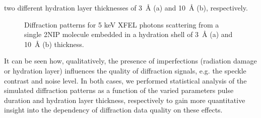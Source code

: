 \documentclass[10pt]{scrartcl}
\begin{document}
two different hydration layer thicknesses of \SI{3}{\angstrom} (a) and
\SI{10}{\angstrom} (b), respectively.
%
\begin{figure}[ht]
  \begin{center}
  \end{center}
  \caption{Diffraction patterns for 5 keV XFEL photons scattering from a single
    2NIP molecule embedded in a hydration shell of \SI{3}{\angstrom} (a) and
    \SI{10}{\angstrom} (b) thickness.}
  \label{fig:2nip_hydration_layer}
\end{figure}

It can be seen how, qualitatively, the presence of imperfections (radiation
damage or hydration layer) influences the quality of diffraction signals, e.g.
the speckle contrast and noise level.
In both cases, we performed statistical analysis of the simulated diffraction
patterns as a function of the varied parameters pulse duration and hydration
layer thickness, respectively to gain more quantitative insight into the
dependency of diffraction data quality on these effects.
\end{document}
